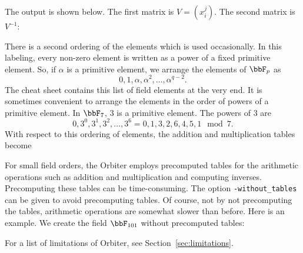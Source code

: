 The output is shown below. 
The first matrix is $V = (x_{i}^j).$ 
The second matrix is $V^{-1}$:


\bigskip



There is a second ordering of the elements which is used occasionally. 
In this labeling, every non-zero element 
is written as a power of a fixed primitive element.
So, if $\alpha$ is a primitive element, 
we arrange the elements of $\bbF_p$ as 
$$
0,1,\alpha,\alpha^2,\ldots,\alpha^{q-2}.
$$
The cheat sheet contains this list of field elements at the very end.
It is sometimes convenient to arrange 
the elements in the order of powers of a primitive element. 
In $\bbF_7$, $3$ is a primitive element. 
The powers of $3$ are 
$$
0,3^0,3^1,3^2,\ldots,3^6 = 0,1,3,2,6,4,5,1 \mod 7.
$$
With respect to this ordering of elements, 
the addition and multiplication tables become






\bigskip


For small field orders, the Orbiter employs 
precomputed tables for the arithmetic operations 
such as addition and multiplication and computing inverses.
Precomputing these tables can be time-consuming. 
The option \verb'-without_tables' 
can be given to avoid precomputing tables. 
Of course, not by not precomputing the tables, 
arithmetic operations are somewhat slower than before.  
Here is an example. 
We create the field $\bbF_{101}$ without precomputed tables:





\bigskip

For a list of limitations of Orbiter, see Section~\ref{sec:limitations}.


\bigskip
